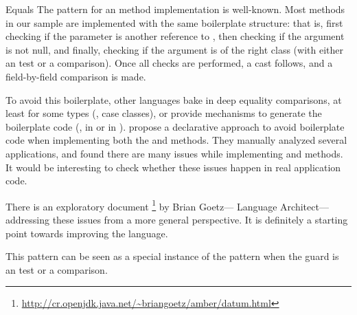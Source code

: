 \begin{pattern}{Equals}
\issues{}
The pattern for an  method implementation is well-known.
Most  methods in our sample are implemented with the same boilerplate structure:
that is, first checking if the parameter is another reference to ,
then checking if the argument is not null,
and finally, checking if the argument is of the right class
(with either an  test or a  comparison).
Once all checks are performed, a cast follows, and a field-by-field comparison is made.

To avoid this boilerplate, other languages bake in deep equality comparisons,
at least for some types (\eg, \scala{} case classes),
or provide mechanisms to generate the boilerplate code (\eg, 
in \haskell{} or \code{\#[derive(Eq)]} in \rust{}).
\cite{vaziriDeclarativeObjectIdentity2007} propose a declarative approach to avoid boilerplate code when implementing
both the  and  methods.
They manually analyzed several applications, and found there are many issues while implementing  and  methods.
It would be interesting to check whether these issues happen in real application code.

There is an exploratory document%
\footnote{\url{http://cr.openjdk.java.net/\~briangoetz/amber/datum.html}}
by Brian Goetz---\java{} Language Architect---addressing these issues from a more general perspective.
It is definitely a starting point towards improving the \java{} language.

This pattern can be seen as a special instance of the  pattern when the guard is an  test or a  comparison.

\end{pattern}